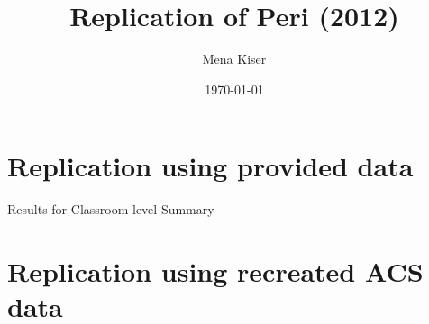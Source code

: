 \documentclass{article}
\title{Replication of Peri (2012)}
\author{Mena Kiser}
\date{\today}
\begin{document}
\maketitle

\section{Replication using provided data}

\begin{table}[h]
\centering
\caption{Results for Classroom-level Summary}
\end{table}

\section{Replication using recreated ACS data}
\end{document}
